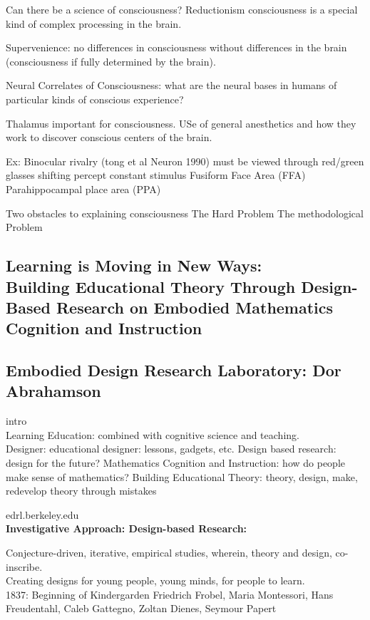 \documentclass{article}
\begin{document}
 Can there be a science of consciousness?
 Reductionism consciousness is a special kind of complex processing in the brain. 
 
 Supervenience: no differences in consciousness without differences in the brain (consciousness if fully determined by the brain). 
 
 Neural Correlates of Consciousness: what are the neural bases in humans of particular kinds of conscious experience?
 
 Thalamus important for consciousness. USe of general anesthetics and how they work to discover conscious centers of the brain. 
 
 Ex: Binocular rivalry (tong et al Neuron 1990) 
    must be viewed through red/green glasses
    shifting percept 
    constant stimulus
Fusiform Face Area (FFA) 
Parahippocampal place area (PPA)


Two obstacles to explaining consciousness 
The Hard Problem 
The methodological Problem

\subsection{Learning is Moving in New Ways: \\ Building Educational Theory Through Design-Based Research on Embodied Mathematics Cognition and Instruction \\  \\ Embodied Design Research Laboratory: Dor Abrahamson}
intro \\
Learning Education: combined with cognitive science and teaching. \\
Designer: educational designer: lessons, gadgets, etc. 
Design based research: design for the future?
Mathematics Cognition and Instruction: how do people make sense of mathematics?
Building Educational Theory: theory, design, make, redevelop theory through mistakes

edrl.berkeley.edu \\

\textbf{Investigative Approach: Design-based Research: }

Conjecture-driven, iterative, empirical studies, wherein, theory and design, co-inscribe. \\
Creating designs for young people, young minds, for people to learn. \\
1837: Beginning of Kindergarden 
Friedrich Frobel, Maria Montessori, Hans Freudentahl, Caleb Gattegno, Zoltan Dienes, Seymour Papert
\end{document}

